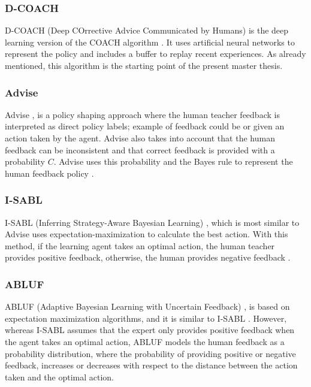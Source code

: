 \subsubsection*{D-COACH}
D-COACH (Deep COrrective Advice Communicated by Humans) \cite{D-COACH-Dattari-Celemin-Ruiz-del-Solar-Kober:2018} is the deep learning version of the COACH algorithm \cite{COACH-Celemin-Ruiz-del-Solar:2015}. It uses artificial neural networks to represent the policy and includes a buffer to replay recent experiences. As already mentioned, this algorithm is the starting point of the present master thesis.



\subsubsection*{Advise}
Advise \cite{Advise-Griffith-et-al:2013}, is a policy shaping approach where the human teacher feedback is interpreted as direct policy labels; example of feedback could be  or  given an action taken by the agent. Advise also takes into account that the human feedback can be inconsistent and that correct feedback is provided with a probability $C$. Advise uses this probability and the Bayes rule to represent the human feedback policy \cite{leveraging-human-guidance:2019}.

\subsubsection*{I-SABL}
I-SABL (Inferring Strategy-Aware Bayesian Learning) \cite{I-SABL-Loftin:2016}, which is most similar to Advise \cite{Advise-Griffith-et-al:2013} uses expectation-maximization to calculate the best action. With this method, if the learning agent takes an optimal action, the human teacher provides positive feedback, otherwise, the human provides negative feedback \cite{leveraging-human-guidance:2019}.


\subsubsection*{ABLUF}
ABLUF (Adaptive Bayesian Learning with Uncertain Feedback) \cite{ABLUF-he:2020}, is based on expectation maximization algorithms, and it is similar to I-SABL \cite{I-SABL-Loftin:2016}. However, whereas I-SABL assumes that the expert only provides positive feedback when the agent takes an optimal action, ABLUF models the human feedback as a probability distribution, where the probability of providing positive or negative feedback, increases or decreases with respect to the distance between the action taken and the optimal action.



